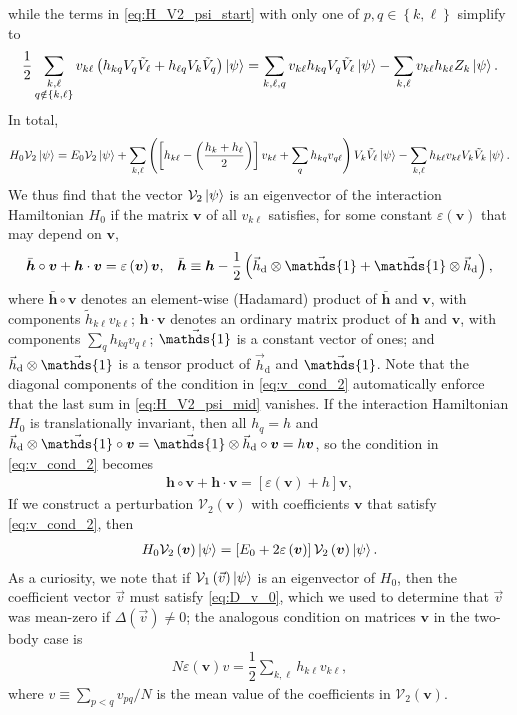 \documentclass[nofootinbib,notitlepage,11pt]{revtex4-2}
\newcommand{\f}[2]{\dfrac{#1}{#2}} %
\newcommand{\p}[1]{\left(#1\right)} %
\renewcommand{\sp}[1]{\left[#1\right]} %
\renewcommand{\set}[1]{\left\{#1\right\}} %
\renewcommand{\c}{\cdot} %
\renewcommand{\oc}{\circ} %
\newcommand{\m}{\bm} %
\renewcommand{\v}{\vec} %
\newcommand{\1}{\mathds{1}}
\renewcommand{\d}{\text{d}}
\newcommand{\e}{\varepsilon}
\newcommand{\V}{\mathcal{V}}
\begin{document}
while the terms in \eqref{eq:H_V2_psi_start} with only one of
$p,q\in\set{k,\ell}$ simplify to
\begin{align}
  \f12 \sum_{\substack{k,\ell\\q\notin\set{k,\ell}}} v_{k\ell}
  \p{h_{kq} V_q \tilde V_\ell + h_{\ell q} V_k \tilde V_q} \ket\psi
  = \sum_{k,\ell,q} v_{k\ell} h_{kq} V_q \tilde V_\ell \ket\psi
  - \sum_{k,\ell} v_{k\ell} h_{k\ell} Z_k \ket\psi.
\end{align}
In total,
\begin{align}
  H_0 \V_2 \ket\psi
  = E_0 \V_2 \ket\psi
  + \sum_{k,\ell} \p{\sp{h_{k\ell}-\p{\f{h_k+h_\ell}{2}}} v_{k\ell}
    + \sum_q h_{kq} v_{q\ell}} V_k \tilde V_\ell \ket\psi
  - \sum_{k,\ell} h_{k\ell} v_{k\ell} V_k \tilde V_k \ket\psi.
  \label{eq:H_V2_psi_mid}
\end{align}
We thus find that the vector $\V_2\ket\psi$ is an eigenvector of the
interaction Hamiltonian $H_0$ if the matrix $\m v$ of all $v_{k\ell}$
satisfies, for some constant $\e\p{\m v}$ that may depend on $\m v$,
\begin{align}
  \bar{\m h}\oc\m v + \m h\c\m v = \e\p{\m v} \m v,
  &&
  \bar{\m h}
  \equiv \m h - \f12\p{\v h_\d\otimes\v\1 + \v\1\otimes\v h_\d},
  \label{eq:v_cond_2}
\end{align}
where $\bar{\m h}\oc\m v$ denotes an element-wise (Hadamard) product
of $\bar{\m h}$ and $\m v$, with components
$\tilde h_{k\ell} v_{k\ell}$; $\m h\c\m v$ denotes an ordinary matrix
product of $\m h$ and $\m v$, with components
$\sum_q h_{kq} v_{q\ell}$; $\v\1$ is a constant vector of ones; and
$\v h_\d\otimes\v\1$ is a tensor product of $\v h_\d$ and $\v\1$.
Note that the diagonal components of the condition in
\eqref{eq:v_cond_2} automatically enforce that the last sum in
\eqref{eq:H_V2_psi_mid} vanishes.  If the interaction Hamiltonian
$H_0$ is translationally invariant, then all $h_q=h$ and
$\v h_\d\otimes\v\1\oc\m v=\v\1\otimes\v h_\d\oc\m v=h\m v$, so the
condition in \eqref{eq:v_cond_2} becomes
\begin{align}
  \m h\oc\m v + \m h\c\m v = \sp{\e\p{\m v}+h} \m v,
\end{align}
If we construct a perturbation $\V_2\p{\m v}$ with coefficients $\m v$
that satisfy \eqref{eq:v_cond_2}, then
\begin{align}
  H_0 \V_2\p{\m v} \ket\psi
  = \sp{E_0 + 2\e\p{\m v}} \V_2\p{\m v} \ket\psi.
\end{align}
As a curiosity, we note that if $\V_1\p{\v v}\ket\psi$ is an
eigenvector of $H_0$, then the coefficient vector $\v v$ must satisfy
\eqref{eq:D_v_0}, which we used to determine that $\v v$ was mean-zero
if $\Delta\p{\v v}\ne0$; the analogous condition on matrices $\m v$ in
the two-body case is
\begin{align}
  N \e\p{\m v} v = \f12 \sum_{k,\ell} h_{k\ell} v_{k\ell},
\end{align}
where $v\equiv\sum_{p<q}v_{pq}/N$ is the mean value of the
coefficients in $\V_2\p{\m v}$.
\end{document}
